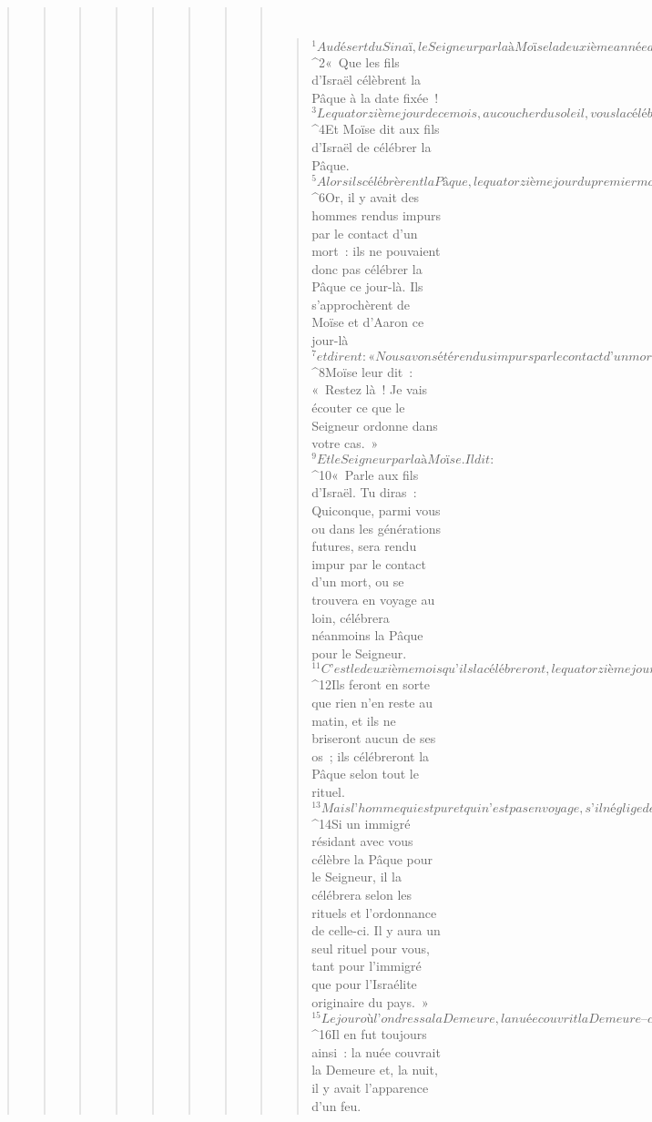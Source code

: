 \begin{verse}
\begin{verse}
\begin{verse}
\begin{verse}
\begin{verse}
\begin{verse}
\begin{verse}
\begin{verse}
         
      \bchapter{}
      \begin{verse}
${}^{1}Au désert du Sinaï, le Seigneur parla à Moïse la deuxième année après leur sortie d’Égypte, au cours du premier mois. Il dit : 
${}^{2}« Que les fils d’Israël célèbrent la Pâque à la date fixée ! 
${}^{3}Le quatorzième jour de ce mois, au coucher du soleil, vous la célébrerez à la date fixée. Vous la célébrerez selon tous les rituels et toutes les ordonnances qui la concernent. » 
${}^{4}Et Moïse dit aux fils d’Israël de célébrer la Pâque. 
${}^{5}Alors ils célébrèrent la Pâque, le quatorzième jour du premier mois, au coucher du soleil, dans le désert du Sinaï. Les fils d’Israël la célébrèrent conformément à tout ce que le Seigneur avait ordonné à Moïse.
${}^{6}Or, il y avait des hommes rendus impurs par le contact d’un mort : ils ne pouvaient donc pas célébrer la Pâque ce jour-là. Ils s’approchèrent de Moïse et d’Aaron ce jour-là 
${}^{7}et dirent : « Nous avons été rendus impurs par le contact d’un mort, mais pourquoi sommes-nous exclus et, de ce fait, privés d’apporter notre présent réservé au Seigneur, à la date fixée, au milieu des fils d’Israël ? » 
${}^{8}Moïse leur dit : « Restez là ! Je vais écouter ce que le Seigneur ordonne dans votre cas. » 
${}^{9}Et le Seigneur parla à Moïse. Il dit : 
${}^{10}« Parle aux fils d’Israël. Tu diras : Quiconque, parmi vous ou dans les générations futures, sera rendu impur par le contact d’un mort, ou se trouvera en voyage au loin, célébrera néanmoins la Pâque pour le Seigneur. 
${}^{11}C’est le deuxième mois qu’ils la célébreront, le quatorzième jour, au coucher du soleil. Ils mangeront l’agneau avec des pains sans levain et des herbes amères. 
${}^{12}Ils feront en sorte que rien n’en reste au matin, et ils ne briseront aucun de ses os ; ils célébreront la Pâque selon tout le rituel. 
${}^{13}Mais l’homme qui est pur et qui n’est pas en voyage, s’il néglige de célébrer la Pâque, cet individu sera retranché de sa parenté car il n’aura pas apporté son présent réservé au Seigneur, à la date fixée ; cet homme-là portera le poids de sa faute. 
${}^{14}Si un immigré résidant avec vous célèbre la Pâque pour le Seigneur, il la célébrera selon les rituels et l’ordonnance de celle-ci. Il y aura un seul rituel pour vous, tant pour l’immigré que pour l’Israélite originaire du pays. »
${}^{15}Le jour où l’on dressa la Demeure, la nuée couvrit la Demeure – c’est-à-dire la tente du Témoignage – et, le soir, il y eut sur la Demeure comme l’apparence d’un feu, et cela jusqu’au matin. 
${}^{16}Il en fut toujours ainsi : la nuée couvrait la Demeure et, la nuit, il y avait l’apparence d’un feu. 

\end{verse}
\end{verse}
\end{verse}
\end{verse}
\end{verse}
\end{verse}
\end{verse}
\end{verse}
\end{verse}
